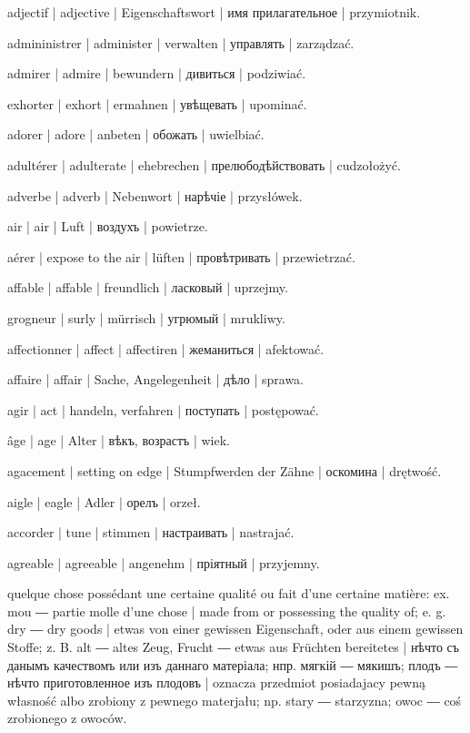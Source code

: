 \begin{outdent}{1em}
adjectif | adjective | Eigenschaftswort | имя прилагательное | przymiotnik.

admininistrer | administer | verwalten | управлять | zarządzać.

admirer | admire | bewundern | дивиться | podziwiać.

exhorter | exhort | ermahnen | увѣщевать | upominać.

adorer | adore | anbeten | обожать | uwielbiać.

adultérer | adulterate | ehebrechen | прелюбодѣйствовать | cudzołożyć.

adverbe | adverb | Nebenwort | нарѣчіе | przysłówek.

air | air | Luft | воздухъ | powietrze.

\uvsubentry{}
aérer | expose to the air | lüften | провѣтривать | przewietrzać.

affable | affable | freundlich | ласковый | uprzejmy.

\uvsubentry{}
grogneur | surly | mürrisch | угрюмый | mrukliwy.

affectionner | affect | affectiren | жеманиться | afektować.

affaire | affair | Sache, Angelegenheit | дѣло | sprawa.

agir | act | handeln, verfahren | поступать | postępować.

âge | age | Alter | вѣкъ, возрастъ | wiek.

agacement | setting on edge | Stumpfwerden der Zähne | оскомина | drętwość.

aigle | eagle | Adler | орелъ | orzeł.

accorder | tune | stimmen | настраивать | nastrajać.

agreable | agreeable | angenehm | пріятный | przyjemny.

quelque chose possédant une certaine qualité ou fait d’une 
certaine matière: ex.  mou ―  partie molle d’une
chose | made from or possessing the quality of; e. g.  dry ―
 dry goods | etwas von einer gewissen Eigenschaft, oder aus
einem gewissen Stoffe; z. B.  alt ―  altes
Zeug,  Frucht ―  etwas aus Früchten bereitetes | нѣчто
съ данымъ качествомъ или изъ даннаго матеріала; нпр. 
мягкій ―  мякишъ;  плодъ ―  нѣчто
приготовленное изъ плодовъ | oznacza przedmiot posiadajacy pewną
własność albo zrobiony z pewnego materjału; np.  stary ―
 starzyzna;  owoc ―  coś zrobionego z owoców.


\end{outdent}
